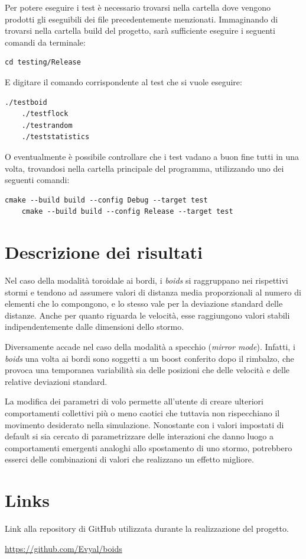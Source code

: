 \documentclass[10pt,a4paper]{article}
\begin{document}
Per potere eseguire i test è necessario trovarsi nella cartella dove vengono prodotti gli eseguibili dei file precedentemente menzionati. Immaginando di trovarsi nella cartella build del progetto, sarà sufficiente eseguire i seguenti comandi da terminale:

\begin{lstlisting}[style=github-bash]
    cd testing/Release
\end{lstlisting}

E digitare il comando corrispondente al test che si vuole eseguire:

\begin{lstlisting}[style=github-bash]
    ./testboid
    ./testflock
    ./testrandom
    ./teststatistics
\end{lstlisting}

O eventualmente è possibile controllare che i test vadano a buon fine tutti in una volta, trovandosi nella cartella principale del programma, utilizzando uno dei seguenti comandi:

\begin{lstlisting}[style=github-bash]
    cmake --build build --config Debug --target test
    cmake --build build --config Release --target test
\end{lstlisting}


\section{Descrizione dei risultati}

Nel caso della modalità toroidale ai bordi, i \textit{boids} si raggruppano nei rispettivi stormi e tendono ad assumere valori di distanza media proporzionali al numero di elementi che lo compongono, e lo stesso vale per la deviazione standard delle distanze. Anche per quanto riguarda le velocità, esse raggiungono valori stabili indipendentemente dalle dimensioni dello stormo.

Diversamente accade nel caso della modalità a specchio (\textit{mirror mode}). Infatti, i \textit{boids} una volta ai bordi sono soggetti a un boost conferito dopo il rimbalzo, che provoca una temporanea variabilità sia delle posizioni che delle velocità e delle relative deviazioni standard.

La modifica dei parametri di volo permette all'utente di creare ulteriori comportamenti collettivi più o meno caotici che tuttavia non rispecchiano il movimento desiderato nella simulazione. Nonostante con i valori impostati di default si sia cercato di parametrizzare delle interazioni che danno luogo a comportamenti emergenti analoghi allo spostamento di uno stormo, potrebbero esserci delle combinazioni di valori che realizzano un effetto migliore.

\section{Links}

\setlength{\parindent}{20pt}
Link alla repository di GitHub utilizzata durante la realizzazione del progetto.

\url{https://github.com/Evyal/boids}
\end{document}
